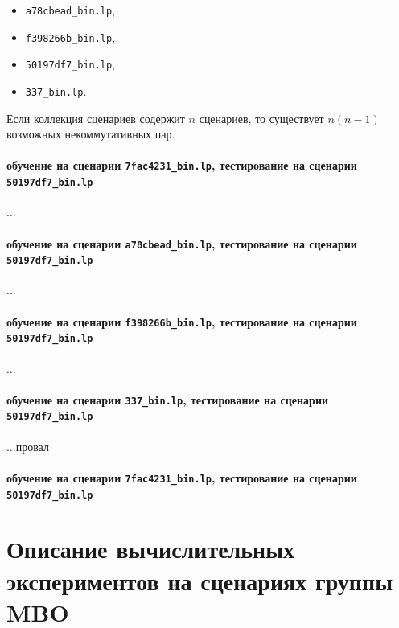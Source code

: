 \documentclass[%
	11pt,
	a4paper,
	utf8,
		]{article}
\begin{document}
{\begin{itemize}
	\item \texttt{a78cbead\_bin.lp},
	
	\item \texttt{f398266b\_bin.lp},
	
	\item \texttt{50197df7\_bin.lp},
	
	\item \texttt{337\_bin.lp}.
\end{itemize}

Если коллекция сценариев содержит $ n $ сценариев, то существует $ n (n - 1) $ возможных некоммутативных пар.

\paragraph{обучение на сценарии \texttt{7fac4231\_bin.lp}, тестирование на сценарии \texttt{50197df7\_bin.lp}}

...

\paragraph{обучение на сценарии \texttt{a78cbead\_bin.lp}, тестирование на сценарии \texttt{50197df7\_bin.lp}}

...


\paragraph{обучение на сценарии \texttt{f398266b\_bin.lp}, тестирование на сценарии \texttt{50197df7\_bin.lp}}

...


\paragraph{обучение на сценарии \texttt{337\_bin.lp}, тестирование на сценарии \texttt{50197df7\_bin.lp}}

...провал

\paragraph{обучение на сценарии \texttt{7fac4231\_bin.lp}, тестирование на сценарии \texttt{50197df7\_bin.lp}}



\section{Описание вычислительных экспериментов на сценариях группы MBO}

}
\end{document}
